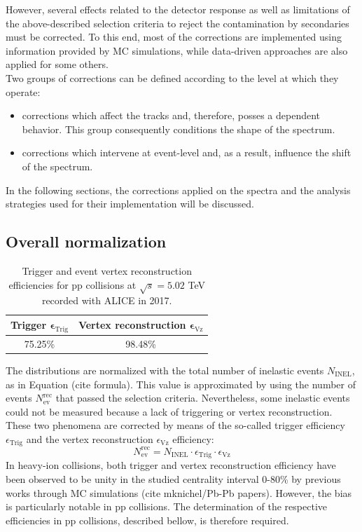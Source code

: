 \documentclass[12pt,a4paper]{report}
\begin{document}
However, several effects related to the detector response as well as limitations of the above-described selection criteria to reject the contamination by secondaries must be corrected. To this end, most of the corrections are implemented using information provided by MC simulations, while data-driven approaches are also applied for some others. \\
Two groups of corrections can be defined according to the level at which they operate: 
\begin{itemize}
\item corrections which affect the tracks and, therefore, posses a \pt dependent behavior. This group consequently conditions the shape of the spectrum.
\item corrections which intervene at event-level and, as a result, influence the shift of the spectrum.
\end{itemize}
In the following sections, the corrections applied on the \pt spectra and the analysis strategies used for their implementation will be discussed.
\subsection{Overall normalization}
\label{Norm}
\begin{table}[H]
\centering
\renewcommand{\arraystretch}{1.5}
\begin{tabular}{|c|c|}
\toprule
\rowcolor{headerBlue}  \textbf{Trigger} $\boldsymbol \epsilon_\text{Trig}$ &  \textbf{Vertex reconstruction} $\boldsymbol \epsilon_\text{Vz}$\\
\hline
75.25\%	&	98.48\%		 \\
\bottomrule
\end{tabular}
\caption{Trigger and event vertex reconstruction efficiencies for pp collisions at $\sqrt{s} = 5.02$ TeV recorded with ALICE in 2017.}
\label{tab:effs}
\end{table} 
The \pt distributions are normalized with the total number of inelastic events $N_\text{INEL}$, as in Equation (cite formula). This value is approximated by using the number of events $N_\text{ev}^\text{rec}$ that passed the selection criteria. Nevertheless, some inelastic events could not be measured because a lack of triggering or vertex reconstruction. These two phenomena are corrected by means of the so-called trigger efficiency $\epsilon_\text{Trig}$ and the vertex reconstruction $\epsilon_\text{Vz}$ efficiency:
\begin{equation}
N_\text{ev}^\text{rec} = N_\text{INEL}\cdot \epsilon_\text{Trig} \cdot \epsilon_\text{Vz}
\end{equation}
In heavy-ion collisions, both trigger and vertex reconstruction efficiency have been observed to be unity in the studied centrality interval 0-80\% by previous works through MC simulations (cite mknichel/Pb-Pb papers). However, the bias is particularly notable in pp collisions. The determination of the respective efficiencies in pp collisions, described bellow, is therefore required.
\end{document}
